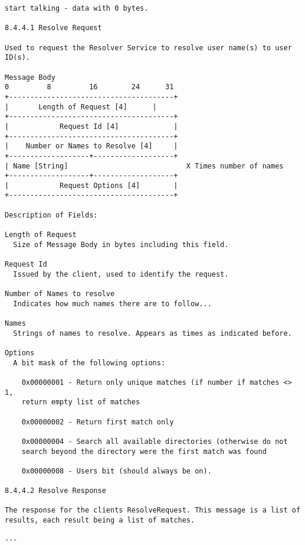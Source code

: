 \documentclass[titlepage,oneside]{book}
\begin{document}
\begin{verbatim}
start talking - data with 0 bytes.

8.4.4.1 Resolve Request

Used to request the Resolver Service to resolve user name(s) to user
ID(s).

Message Body
0         8         16        24      31
+---------------------------------------+
|       Length of Request [4]      |
+---------------------------------------+
|            Request Id [4]             |
+---------------------------------------+
|    Number or Names to Resolve [4]     |
+-------------------+-------------------+
| Name [String]                            X Times number of names
+-------------------+-------------------+
|            Request Options [4]        |
+---------------------------------------+

Description of Fields:

Length of Request
  Size of Message Body in bytes including this field.

Request Id
  Issued by the client, used to identify the request.

Number of Names to resolve
  Indicates how much names there are to follow...

Names
  Strings of names to resolve. Appears as times as indicated before.

Options
  A bit mask of the following options:

    0x00000001 - Return only unique matches (if number if matches <> 1,
    return empty list of matches

    0x00000002 - Return first match only

    0x00000004 - Search all available directories (otherwise do not
    search beyond the directory were the first match was found

    0x00000008 - Users bit (should always be on).

8.4.4.2 Resolve Response

The response for the clients ResolveRequest. This message is a list of
results, each result being a list of matches.

---



\end{verbatim}
\end{document}
